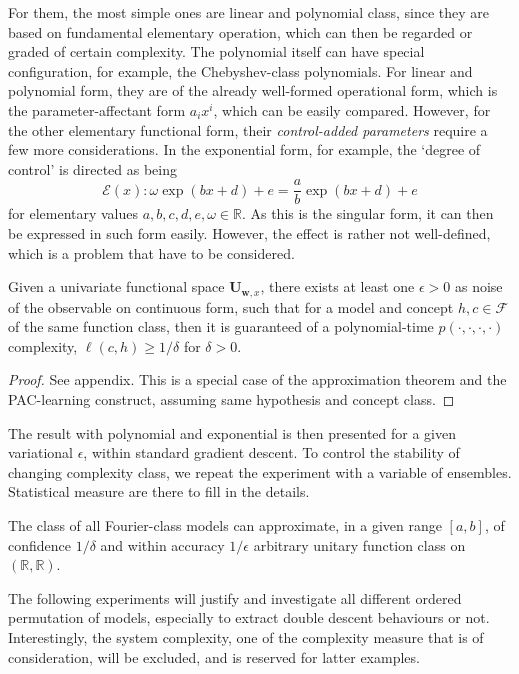 \documentclass{article}
\begin{document}
For them, the most simple ones are linear and polynomial class, since they are based on fundamental elementary operation, which can then be regarded or graded of certain complexity. The polynomial itself can have special configuration, for example, the Chebyshev-class polynomials. For linear and polynomial form, they are of the already well-formed operational form, which is the parameter-affectant form $a_{i}x^{i}$, which can be easily compared. However, for the other elementary functional form, their \textit{control-added parameters} require a few more considerations. In the exponential form, for example, the `degree of control' is directed as being 
\begin{equation}
  \mathcal{E}(x) : \omega \exp{(bx+d)}+ e = \frac{a}{b} \exp{(bx + d)} + e 
\end{equation}
for elementary values $a,b,c,d,e,\omega \in \mathbb{R}$. As this is the singular form, it can then be expressed in such form easily. However, the effect is rather not well-defined, which is a problem that have to be considered. 

\begin{theorem}
  Given a univariate functional space $\mathbf{U}_{\mathbf{w},x}$, there exists at least one $\epsilon > 0$ as noise of the observable on continuous form, such that for a model and concept $h,c\in \mathcal{F}$ of the same function class, then it is guaranteed of a polynomial-time $p(\cdot,\cdot,\cdot,\cdot)$ complexity, $\ell(c,h)\geq 1/\delta$ for $\delta > 0$. 
\end{theorem}
\begin{proof}
  See appendix. This is a special case of the approximation theorem and the PAC-learning construct, assuming same hypothesis and concept class. 
\end{proof}
The result with polynomial and exponential is then presented for a given variational $\epsilon$, within standard gradient descent. To control the stability of changing complexity class, we repeat the experiment with a variable of ensembles. Statistical measure are there to fill in the details. 

\begin{theorem}
  The class of all Fourier-class models can approximate, in a given range $[a,b]$, of confidence $1/\delta$ and within accuracy $1/\epsilon$ arbitrary unitary function class on $(\mathbb{R},\mathbb{R})$. 
\end{theorem}


The following experiments will justify and investigate all different ordered permutation of models, especially to extract double descent behaviours or not. Interestingly, the system complexity, one of the complexity measure that is of consideration, will be excluded, and is reserved for latter examples. 
\end{document}
